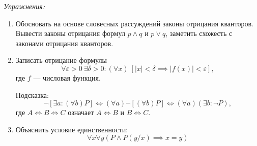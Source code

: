 \vspace{1em}
{\it Упражнения:}
\begin{enumerate}
	\item{}Обосновать на основе словесных рассуждений законы отрицания
	кванторов\label{ex:quantor_neg_def}. Вывести законы отрицания формул
	$p\land q$ и $p\lor q$, заметить схожесть с законами отрицания кванторов.
	\item{}Записать отрицание формулы
	\[
		\forall \varepsilon>0~\exists \delta>0:
		(\forall x)~[|x|<\delta\implies |f(x)|<\varepsilon],
	\]
	где $f$ --- числовая функция.

	Подсказка:
	\[
		\lnot[\exists a:(\forall b)P]\iff(\forall a)\lnot[(\forall b)P]\iff
		(\forall a)(\exists b:\lnot P),
	\]
	где $A\iff B\iff C$ означает $A\iff B$ и $B\iff C$.

	\item{}Объяснить условие единственности:
	\[
		\forall x\forall y(P\land P(y/x)\implies x=y)
	\]
\end{enumerate}
